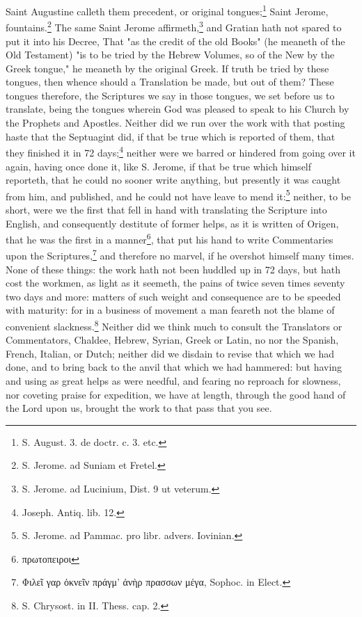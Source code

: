 Saint Augustine calleth them precedent, or original tongues;\footnote{S. August. 3. de doctr. c. 3. etc.} Saint Jerome, fountains.\footnote{S. Jerome. ad Suniam et Fretel.} The same Saint Jerome affirmeth,\footnote{S. Jerome. ad Lucinium, Dist. 9 ut veterum.} and Gratian hath not spared to put it into his Decree, That "as the credit of the old Books" (he meaneth of the Old Testament) "is to be tried by the Hebrew Volumes, so of the New by the Greek tongue," he meaneth by the original Greek. If truth be tried by these tongues, then whence should a Translation be made, but out of them? These tongues therefore, the Scriptures we say in those tongues, we set before us to translate, being the tongues wherein God was pleased to speak to his Church by the Prophets and Apostles. Neither did we run over the work with that posting haste that the Septuagint did, if that be true which is reported of them, that they finished it in 72 days;\footnote{Joseph. Antiq. lib. 12.} neither were we barred or hindered from going over it again, having once done it, like S. Jerome, if that be true which himself reporteth, that he could no sooner write anything, but presently it was caught from him, and published, and he could not have leave to mend it:\footnote{S. Jerome. ad Pammac. pro libr. advers. Iovinian.} neither, to be short, were we the first that fell in hand with translating the Scripture into English, and consequently destitute of former helps, as it is written of Origen, that he was the first in a manner\footnote{\foreignlanguage{greek}{πρωτοπειροι}}, that put his hand to write Commentaries upon the Scriptures,\footnote{\foreignlanguage{greek}{Φιλεῖ γαρ ὀκνεῖν πράγμ’ ἀνὴρ πρασσων μέγα}, Sophoc. in Elect.} and therefore no marvel, if he overshot himself many times. None of these things: the work hath not been huddled up in 72 days, but hath cost the workmen, as light as it seemeth, the pains of twice seven times seventy two days and more: matters of such weight and consequence are to be speeded with maturity: for in a business of movement a man feareth not the blame of convenient slackness.\footnote{S. Chrysost. in II. Thess. cap. 2.} Neither did we think much to consult the Translators or Commentators, Chaldee, Hebrew, Syrian, Greek or Latin, no nor the Spanish, French, Italian, or Dutch; neither did we disdain to revise that which we had done, and to bring back to the anvil that which we had hammered: but having and using as great helps as were needful, and fearing no reproach for slowness, nor coveting praise for expedition, we have at length, through the good hand of the Lord upon us, brought the work to that pass that you see.


